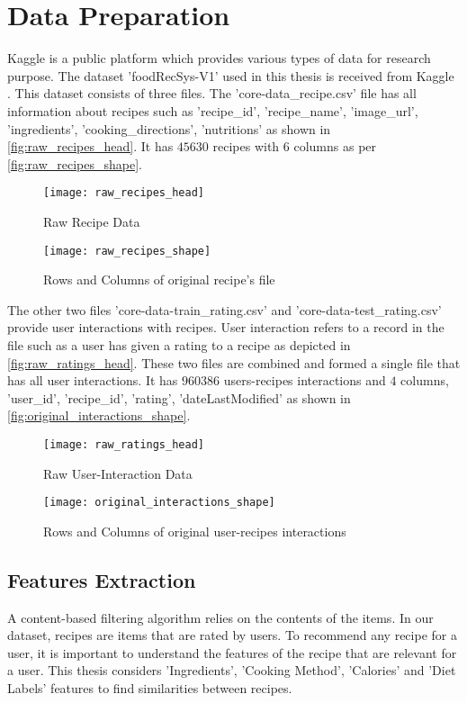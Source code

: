 
\section{Data Preparation}
\label{sec:data_prep}
Kaggle is a public platform which provides various types of data for research purpose. The dataset 'foodRecSys-V1' used in this thesis is received from Kaggle \cite{48}. This dataset consists of three files. The 'core-data\_recipe.csv' file has all information about recipes such as 'recipe\_id', 'recipe\_name', 'image\_url', 'ingredients', 'cooking\_directions', 'nutritions' as shown in \autoref{fig:raw_recipes_head}. It has $45630$ recipes with $6$ columns as per \autoref{fig:raw_recipes_shape}.

\begin{figure}[H]
	\centering
	\texttt{[image: raw\_recipes\_head]}
	\caption{Raw Recipe Data}
	\label{fig:raw_recipes_head}
\end{figure}

\begin{figure}[H]
	\centering
	\texttt{[image: raw\_recipes\_shape]}
	\caption{Rows and Columns of original recipe's file}
	\label{fig:raw_recipes_shape}
\end{figure}

\noindent The other two files 'core-data-train\_rating.csv' and 'core-data-test\_rating.csv' provide user interactions with recipes. User interaction refers to a record in the file such as a user has given a rating to a recipe as depicted in \autoref{fig:raw_ratings_head}. These two files are combined and formed a single file that has all user interactions.  It has $960386$ users-recipes interactions and $4$ columns, 'user\_id', 'recipe\_id', 'rating', 'dateLastModified' as shown in
 \autoref{fig:original_interactions_shape}.

\begin{figure}[H]
	\centering
	\texttt{[image: raw\_ratings\_head]}
	\caption{Raw User-Interaction Data}
	\label{fig:raw_ratings_head}
\end{figure}

\begin{figure}[H]
	\centering
	\texttt{[image: original\_interactions\_shape]}
	\caption{Rows and Columns of original user-recipes interactions }
	\label{fig:original_interactions_shape}
\end{figure}  


\subsection{Features Extraction}
A content-based filtering algorithm relies on the contents of the items. In our dataset, recipes are items that are rated by users. To recommend any recipe for a user, it is important to understand the features of the recipe that are relevant for a user. This thesis considers 'Ingredients', 'Cooking Method', 'Calories' and 'Diet Labels' features to find similarities between recipes.

